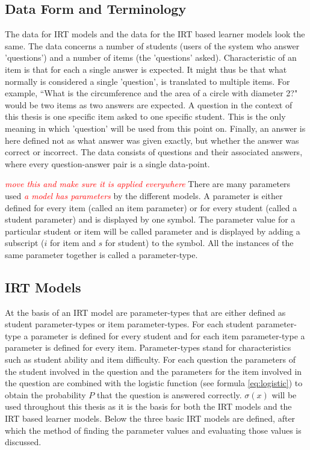 \documentclass{scrartcl}
\newcommand\todo[1]{\textit{\textcolor{red}{#1}}}
\begin{document}
\subsection{Data Form and Terminology}
The data for IRT models and the data for the IRT based learner models look the same. The data concerns a number of students (users of the system who answer 'questions') and a number of items (the 'questions' asked). Characteristic of an item is that for each a single answer is expected. It might thus be that what normally is considered a single 'question', is translated to multiple items. For example, ``What is the circumference and the area of a circle with diameter 2?" would be two items as two answers are expected. A question in the context of this thesis is one specific item asked to one specific student. This is the only meaning in which 'question' will be used from this point on. Finally, an answer is here defined not as what answer was given exactly, but whether the answer was correct or incorrect. The data consists of questions and their associated answers, where every question-answer pair is a single data-point.  

\todo{move this and make sure it is applied everywhere}
There are many parameters used \todo{a model has parameters} by the different models. A parameter is either defined for every item (called an item parameter) or for every student (called a student parameter) and is displayed by one symbol. The parameter value for a particular student or item will be called parameter and is displayed by adding a subscript ($i$ for item and $s$ for student) to the symbol. All the instances of the same parameter together is called a parameter-type. 

\subsection{IRT Models}
At the basis of an IRT model are parameter-types that are either defined as student parameter-types or item parameter-types. For each student parameter-type a parameter is defined for every student and for each item parameter-type a parameter is defined for every item. Parameter-types stand for characteristics such as student ability and item difficulty. For each question the parameters of the student involved in the question and the parameters for the item involved in the question are combined with the logistic function (see formula \ref{eq:logistic}) to obtain the probability $P$ that the question is answered correctly. $\sigma(x)$ will be used throughout this thesis as it is the basis for both the IRT models and the IRT based learner models. Below the three basic IRT models are defined, after which the method of finding the parameter values and evaluating those values is discussed. 
\end{document}
